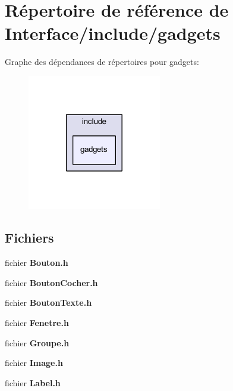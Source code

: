 \section{Répertoire de référence de Interface/include/gadgets}
\label{dir_9ab5a57497ef2c36b4a22954635ab49a}
Graphe des dépendances de répertoires pour gadgets\+:\nopagebreak
\begin{figure}[H]
\begin{center}
\leavevmode
\includegraphics[width=166pt]{dir_9ab5a57497ef2c36b4a22954635ab49a_dep}
\end{center}
\end{figure}
\subsection*{Fichiers}
\begin{DoxyCompactItemize}
\item 
fichier {\bf Bouton.\+h}
\item 
fichier {\bf Bouton\+Cocher.\+h}
\item 
fichier {\bf Bouton\+Texte.\+h}
\item 
fichier {\bf Fenetre.\+h}
\item 
fichier {\bf Groupe.\+h}
\item 
fichier {\bf Image.\+h}
\item 
fichier {\bf Label.\+h}
\end{DoxyCompactItemize}
